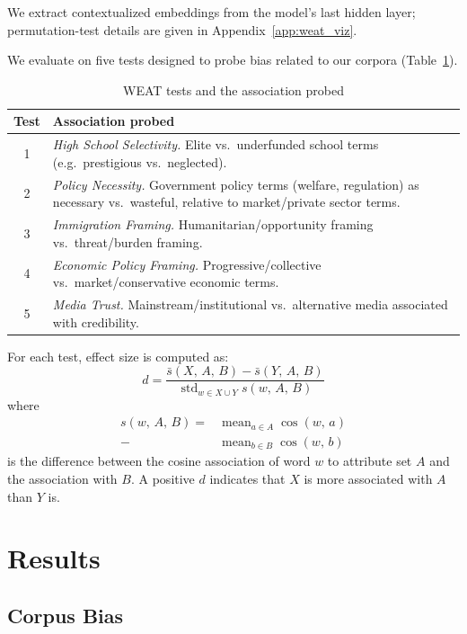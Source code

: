 \documentclass[11pt]{article}
\begin{document}
We extract contextualized embeddings from the model's last hidden layer; permutation-test details are given in Appendix~\ref{app:weat_viz}.

We evaluate on five tests designed to probe bias related to our corpora (Table~\ref{tab:weat_tests}).

\begin{table}[htbp]
  \centering
  \small
  \begin{tabular}{cp{5.5cm}}
    \toprule
    Test & Association probed \\
    \midrule
    1 & \textit{High School Selectivity.} Elite vs.\ underfunded school terms (e.g.\ prestigious vs.\ neglected). \\
    2 & \textit{Policy Necessity.} Government policy terms (welfare, regulation) as necessary vs.\ wasteful, relative to market/private sector terms. \\
    3 & \textit{Immigration Framing.} Humanitarian/opportunity framing vs.\ threat/burden framing. \\
    4 & \textit{Economic Policy Framing.} Progressive/collective vs.\ market/conservative economic terms. \\
    5 & \textit{Media Trust.} Mainstream/institutional vs.\ alternative media associated with credibility. \\
    \bottomrule
  \end{tabular}
  \caption{WEAT tests and the association probed}
  \label{tab:weat_tests}
\end{table}

For each test, effect size is computed as:
\[
  d = \frac{\bar{s}(X,\,A,\,B) - \bar{s}(Y,\,A,\,B)}
  {\operatorname{std}_{w \in X \cup Y} s(w,\,A,\,B)}
\]
where
\[
\begin{split}
  s(w,\,A,\,B) =
  {}&\operatorname{mean}_{a \in A} \cos(w,\,a) \\
  {}-{} &\operatorname{mean}_{b \in B} \cos(w,\,b)
\end{split}
\]
is the difference between the cosine association of word $w$ to attribute set $A$ and the association with $B$.
A positive $d$ indicates that $X$ is more associated with $A$ than $Y$ is.

\section{Results}

\subsection{Corpus Bias}
\label{subsec:corpus_bias}
\end{document}
